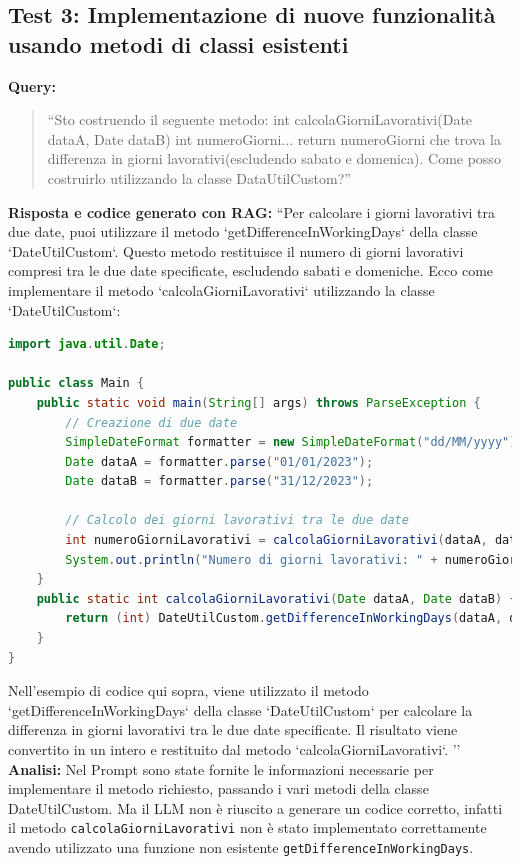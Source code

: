 \documentclass[12pt,a4paper,openright,twoside]{book}
\begin{document}
\subsection{Test 3: Implementazione di nuove funzionalità usando metodi di classi esistenti}
\textbf{Query:}
\begin{quote}
``Sto costruendo il seguente metodo: int calcolaGiorniLavorativi(Date dataA, Date dataB){
    int numeroGiorni...
    return numeroGiorni}
    che trova la differenza in giorni lavorativi(escludendo sabato e domenica). Come posso costruirlo utilizzando la classe DataUtilCustom?''
\end{quote}
\textbf{Risposta e codice generato con RAG:}
``Per calcolare i giorni lavorativi tra due date, puoi utilizzare il metodo `getDifferenceInWorkingDays` della classe `DateUtilCustom`. Questo metodo restituisce il numero di giorni lavorativi compresi tra le due date specificate, escludendo sabati e domeniche.   
Ecco come implementare il metodo `calcolaGiorniLavorativi` utilizzando la classe `DateUtilCustom`:
\begin{lstlisting}[language=Java]
import java.util.Date;

public class Main {
    public static void main(String[] args) throws ParseException {
        // Creazione di due date
        SimpleDateFormat formatter = new SimpleDateFormat("dd/MM/yyyy");
        Date dataA = formatter.parse("01/01/2023");
        Date dataB = formatter.parse("31/12/2023");

        // Calcolo dei giorni lavorativi tra le due date
        int numeroGiorniLavorativi = calcolaGiorniLavorativi(dataA, dataB);
        System.out.println("Numero di giorni lavorativi: " + numeroGiorniLavorativi);
    }
    public static int calcolaGiorniLavorativi(Date dataA, Date dataB) {
        return (int) DateUtilCustom.getDifferenceInWorkingDays(dataA, dataB);
    }
}
\end{lstlisting}
Nell'esempio di codice qui sopra, viene utilizzato il metodo `getDifferenceInWorkingDays` della classe `DateUtilCustom` per calcolare la differenza in giorni lavorativi tra le due date specificate. Il risultato viene convertito in un intero e restituito dal metodo `calcolaGiorniLavorativi`.
''
\textbf{Analisi:}
Nel Prompt sono state fornite le informazioni necessarie per implementare il metodo richiesto, passando i vari metodi della classe DateUtilCustom. 
Ma il LLM non è riuscito a generare un codice corretto, infatti il metodo \texttt{calcolaGiorniLavorativi} non è stato implementato correttamente
avendo utilizzato una funzione non esistente \texttt{getDifferenceInWorkingDays}.
\end{document}
